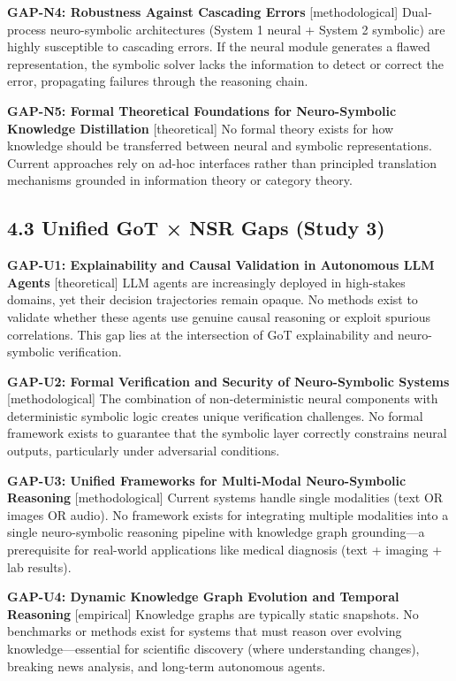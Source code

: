 \documentclass[11pt,a4paper]{article}
\begin{document}
\textbf{GAP-N4: Robustness Against Cascading Errors} [methodological]
Dual-process neuro-symbolic architectures (System 1 neural + System 2 symbolic) are highly susceptible to cascading errors. If the neural module generates a flawed representation, the symbolic solver lacks the information to detect or correct the error, propagating failures through the reasoning chain.

\textbf{GAP-N5: Formal Theoretical Foundations for Neuro-Symbolic Knowledge Distillation} [theoretical]
No formal theory exists for how knowledge should be transferred between neural and symbolic representations. Current approaches rely on ad-hoc interfaces rather than principled translation mechanisms grounded in information theory or category theory.

\subsection{4.3 Unified GoT × NSR Gaps (Study 3)}

\textbf{GAP-U1: Explainability and Causal Validation in Autonomous LLM Agents} [theoretical]
LLM agents are increasingly deployed in high-stakes domains, yet their decision trajectories remain opaque. No methods exist to validate whether these agents use genuine causal reasoning or exploit spurious correlations. This gap lies at the intersection of GoT explainability and neuro-symbolic verification.

\textbf{GAP-U2: Formal Verification and Security of Neuro-Symbolic Systems} [methodological]
The combination of non-deterministic neural components with deterministic symbolic logic creates unique verification challenges. No formal framework exists to guarantee that the symbolic layer correctly constrains neural outputs, particularly under adversarial conditions.

\textbf{GAP-U3: Unified Frameworks for Multi-Modal Neuro-Symbolic Reasoning} [methodological]
Current systems handle single modalities (text OR images OR audio). No framework exists for integrating multiple modalities into a single neuro-symbolic reasoning pipeline with knowledge graph grounding—a prerequisite for real-world applications like medical diagnosis (text + imaging + lab results).

\textbf{GAP-U4: Dynamic Knowledge Graph Evolution and Temporal Reasoning} [empirical]
Knowledge graphs are typically static snapshots. No benchmarks or methods exist for systems that must reason over evolving knowledge—essential for scientific discovery (where understanding changes), breaking news analysis, and long-term autonomous agents.
\end{document}
